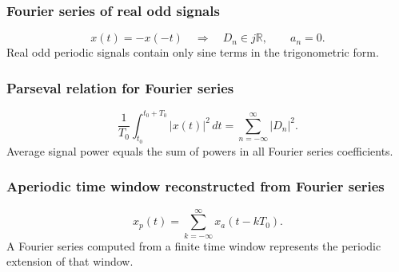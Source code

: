 \subsubsection{Fourier series of real odd signals}
\[
x(t)=-x(-t) \quad \Rightarrow \quad D_n\in j\mathbb{R},\qquad a_n=0.
\]
Real odd periodic signals contain only sine terms in the trigonometric form.

\subsubsection{Parseval relation for Fourier series}
\[
\frac{1}{T_0}\int_{t_0}^{t_0+T_0}|x(t)|^2\,dt
=\sum_{n=-\infty}^{\infty}|D_n|^2.
\]
Average signal power equals the sum of powers in all Fourier series coefficients.

\subsubsection{Aperiodic time window reconstructed from Fourier series}
\[
x_p(t)=\sum_{k=-\infty}^{\infty}x_a(t-kT_0).
\]
A Fourier series computed from a finite time window represents the periodic extension of that window.
